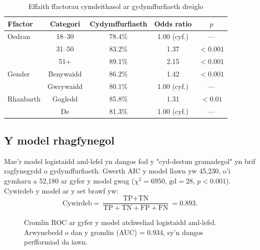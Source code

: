 \documentclass[12pt,a4paper]{article}
\begin{document}
\begin{table}[ht]
\centering
\caption{Effaith ffactorau cymdeithasol ar gydymffurfiaeth dreiglo}
\label{tab:ffactorau}
\begin{tabular}{lcccc}
\toprule
Ffactor & Categori & Cydymffurfiaeth & Odds ratio & $p$ \\
\midrule
Oedran & 18--30 & 78.4\% & 1.00 (cyf.) & --- \\
        & 31--50 & 83.2\% & 1.37 & $<0.001$ \\
        & 51+ & 89.1\% & 2.15 & $<0.001$ \\
\midrule
Gender & Benywaidd & 86.2\% & 1.42 & $<0.001$ \\
       & Gwrywaidd & 80.1\% & 1.00 (cyf.) & --- \\
\midrule
Rhanbarth & Gogledd & 85.8\% & 1.31 & $<0.01$ \\
           & De & 81.3\% & 1.00 (cyf.) & --- \\
\bottomrule
\end{tabular}
\end{table}

\subsection{Y model rhagfynegol}

Mae'r model logistaidd aml-lefel yn dangos fod y
"cyd-destun gramadegol" yn brif ragfynegydd o gydymffurfiaeth.
Gwerth AIC y model llawn yw 45,230, o'i gymharu a 52,180
ar gyfer y model gwag ($\chi^2 = 6950$, $\text{gd} = 28$,
$p < 0.001$). Cywirdeb y model ar y set brawf yw:
\begin{equation}
\label{eq:cywirdeb}
\text{Cywirdeb} = \frac{\text{TP} + \text{TN}}{\text{TP} + \text{TN} + \text{FP} + \text{FN}} = 0.893.
\end{equation}

\begin{figure}[ht]
\centering
{}
\caption{Cromlin ROC ar gyfer y model atchweliad logistaidd aml-lefel.
Arwynebedd o dan y gromlin (AUC) = 0.934, sy'n dangos
perfformiad da iawn.}
\label{fig:roc}
\end{figure}
\end{document}
